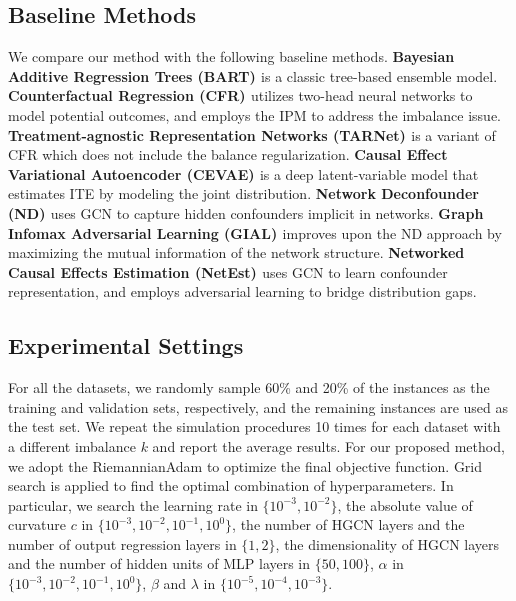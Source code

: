 \documentclass[twoside,leqno,twocolumn]{article}
\begin{document}
\subsection{Baseline Methods}
We compare our method with the following baseline methods.
\textbf{Bayesian Additive Regression Trees (BART) \cite{hill2011bayesian}} is a classic tree-based ensemble model.
\textbf{Counterfactual Regression (CFR) \cite{shalit2017estimating}} utilizes two-head neural networks to model potential outcomes, and employs the IPM to address the imbalance issue. 
\textbf{Treatment-agnostic Representation Networks (TARNet) \cite{shalit2017estimating}} is a variant of CFR which does not include the balance regularization.
\textbf{Causal Effect Variational Autoencoder (CEVAE) \cite{louizos2017causal}} is a deep latent-variable model that estimates ITE by modeling the joint distribution. 
 \textbf{Network Deconfounder (ND) \cite{guo2020learning}} uses GCN to capture hidden confounders implicit in networks.
\textbf{Graph Infomax Adversarial Learning (GIAL) \cite{chu2021graph}} improves upon the ND approach by maximizing the mutual information of the network structure.
\textbf {Networked Causal Effects Estimation (NetEst) \cite{jiang2022estimating}} uses GCN to learn confounder representation, and employs adversarial learning to bridge distribution gaps.


\vspace{-0.5em}
\subsection{Experimental Settings}
For all the datasets, we randomly sample 60\% and 20\% of the instances as the training and validation sets, respectively, and the remaining instances are used as the test set. We repeat the simulation procedures 10 times for each dataset with a different imbalance $k$ and report the average results.
For our proposed method, we adopt the RiemannianAdam \cite{chami2019hyperbolic} to optimize the final objective function. Grid search is applied to find the optimal combination of hyperparameters. In particular, we search the learning rate in $\{10^{-3}, 10^{-2} \}$, the absolute value of curvature $c$ in $\{10^{-3}, 10^{-2}, 10^{-1}, 10^{0} \}$, the number of HGCN layers and the number of output regression layers in $\{1,2\}$, 
the dimensionality of HGCN layers and the number of hidden units of  MLP layers in $\{50,100\}$, $\alpha$ in $\{10^{-3}, 10^{-2}, 10^{-1}, 10^{0} \}$, $\beta$ and $\lambda$ in 
$\{10^{-5}, 10^{-4}, 10^{-3}\}$.
\end{document}
